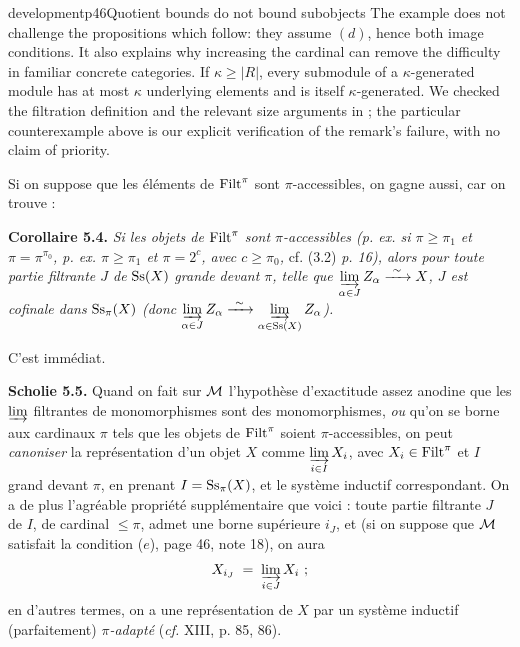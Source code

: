 \begin{dcomment}{development}{p46}{Quotient bounds do not bound subobjects}
The example does not challenge the propositions which follow: they assume $(d)$, hence both image conditions. It also explains why increasing the cardinal can remove the difficulty in familiar concrete categories. If $\kappa\geq|R|$, every submodule of a $\kappa$-generated module has at most $\kappa$ underlying elements and is itself $\kappa$-generated. We checked the filtration definition and the relevant size arguments in \citep[Expos\'e~I, 9.12--9.16]{SGA4I1972}; the particular counterexample above is our explicit verification of the remark's failure, with no claim of priority.
\end{dcomment}



Si on suppose que les éléments de $\mathrm{Filt}^{\pi}$ sont $\pi$-accessibles, on gagne aussi, car on trouve :

\textbf{Corollaire 5.4.} \textit{Si les objets de} $\mathrm{Filt}^{\pi}$ \textit{sont $\pi$-accessibles (p. ex. si $\pi \geq \pi_1$ et $\pi = \pi^{\pi_0}$, p. ex. $\pi \geq \pi_1$ et $\pi = 2^{c}$, avec $c \geq \pi_0$,} cf. (3.2) \textit{p. 16), alors pour toute partie filtrante $J$ de} $\mathrm{Ss}(X)$ \textit{grande devant $\pi$, telle que $\varinjlim\limits_{\alpha\in J} Z_{\alpha} \xrightarrow{\ \sim\ } X$, $J$ est cofinale dans} $\mathrm{Ss}_{\pi}(X)$ \textit{(donc $\varinjlim\limits_{\alpha\in J} Z_{\alpha} \xrightarrow{\ \sim\ } \varinjlim\limits_{\alpha\in\mathrm{Ss}(X)} Z_{\alpha}$).}

C'est immédiat.

\textbf{Scholie 5.5.} Quand on fait sur $\mathcal{M}$ l'hypothèse d'exactitude assez anodine que les $\varinjlim$ filtrantes de monomorphismes sont des monomorphismes, \textit{ou} qu'on se borne aux cardinaux $\pi$ tels que les objets de $\mathrm{Filt}^{\pi}$ soient $\pi$-accessibles, on peut \textit{canoniser} la représentation d'un objet $X$ comme $\varinjlim\limits_{i\in I} X_i$, avec $X_i \in \mathrm{Filt}^{\pi}$ et $I$ grand devant $\pi$, en prenant $I = \mathrm{Ss}_{\pi}(X)$, et le système inductif correspondant. On a de plus l'agréable propriété supplémentaire que voici : toute partie filtrante $J$ de $I$, de cardinal $\leq \pi$, admet une borne supérieure $i_J$, et (si on suppose que $\mathcal{M}$ satisfait la condition ($e$), page 46, note 18), on aura
\[
X_{i_J} \;=\; \varinjlim_{i\in J} X_i \ ;
\]
en d'autres termes, on a une représentation de $X$ par un système inductif (parfaitement) \textit{$\pi$-adapté} (\textit{cf.} XIII, p. 85, 86).

